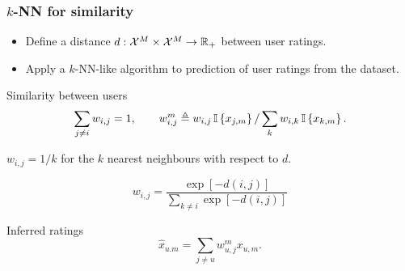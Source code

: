 \begin{frame}
  \frametitle{$k$-NN for similarity}
  \begin{exercise}
    \begin{itemize}
      \item Define a distance $d : {\mathcal{X}}^M \times {\mathcal{X}}^M \to {\mathbb{R}}_+$ between user ratings.
      \item Apply a $k$-NN-like algorithm to prediction of user ratings from the dataset.
    \end{itemize}
  \end{exercise}
\end{frame}
\begin{frame}
\begin{block}{Similarity between users}
    \[
    \sum_{j \neq i} w_{i,j} = 1,
    \qquad
    w^m_{i,j} \mathrel{\triangleq} w_{i,j} \mathop{\mbox{\ensuremath{\mathbb{I}}}}\left\{x_{j,m}\right\} / \sum_k w_{i,k} \mathop{\mbox{\ensuremath{\mathbb{I}}}}\left\{x_{k,m}\right\}.
    \]
  \end{block}

  \begin{example}
    $w_{i,j} = 1/k$ for the $k$ nearest neighbours with respect to $d$.
  \end{example}


  \begin{example}
    \[
    w_{i,j} = \frac{\exp[-d(i,j)]}{\sum_{k \neq i} \exp[-d(i,j)]}
    \]
  \end{example}

  \begin{block}{Inferred ratings}
    \[
    \hat{x}_{u.m} = \sum_{j \neq u} w^m_{u,j} x_{u,m}.
    \]
  \end{block}
  
\end{frame}

